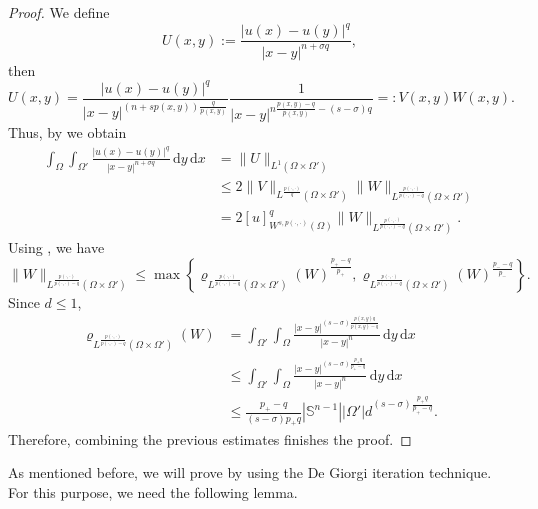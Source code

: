 \documentclass[11pt]{amsart}
\theoremstyle{plain}
\theoremstyle{definition}
\numberwithin{equation}{section}
\begin{document}
\begin{proof}
We define
\begin{equation*}
U(x,y) := \frac{|u(x)-u(y)|^q}{|x-y|^{n+\sigma q}},
\end{equation*}
then
\begin{equation*}
U(x,y) = \frac{|u(x)-u(y)|^q}{|x-y|^{(n+sp(x,y))\frac{q}{p(x,y)}}} \frac{1}{|x-y|^{n\frac{p(x,y)-q}{p(x,y)}- (s-\sigma)q}} =: V(x,y) W(x,y).
\end{equation*}
Thus, by  we obtain
\begin{equation*}
\begin{split}
\int_{\Omega} \int_{\Omega'} \frac{|u(x)-u(y)|^q}{|x-y|^{n+\sigma q}} \,\mathrm{d}y \,\mathrm{d}x 
&= \|U\|_{L^1(\Omega \times \Omega')} \\
&\leq 2\|V\|_{L^{\frac{p(\cdot,\cdot)}{q}}(\Omega \times \Omega')} \|W\|_{L^{\frac{p(\cdot,\cdot)}{p(\cdot,\cdot)-q}}(\Omega \times \Omega')} \\
&= 2[u]_{W^{s,p(\cdot,\cdot)}(\Omega)}^q \|W\|_{L^{\frac{p(\cdot,\cdot)}{p(\cdot,\cdot)-q}}(\Omega \times \Omega')}.
\end{split}
\end{equation*}
Using , we have
\begin{equation*}
\|W\|_{L^{\frac{p(\cdot,\cdot)}{p(\cdot,\cdot)-q}}(\Omega \times \Omega')} \leq \max \left\lbrace \varrho_{L^{\frac{p(\cdot,\cdot)}{p(\cdot,\cdot)-q}}(\Omega \times \Omega')}(W)^{\frac{p_+-q}{p_+}}, \varrho_{L^{\frac{p(\cdot,\cdot)}{p(\cdot,\cdot)-q}}(\Omega \times \Omega')}(W)^{\frac{p_--q}{p_-}} \right\rbrace.
\end{equation*}
Since $d \leq 1$, 
\begin{equation*}
\begin{split}
\varrho_{L^{\frac{p(\cdot,\cdot)}{p(\cdot,\cdot)-q}}(\Omega \times \Omega')}(W)
&= \int_{\Omega'} \int_{\Omega} \frac{|x-y|^{(s-\sigma)\frac{p(x,y)q}{p(x,y)-q}}}{|x-y|^n} \,\mathrm{d}y \,\mathrm{d}x \\
&\leq \int_{\Omega'} \int_{\Omega} \frac{|x-y|^{(s-\sigma)\frac{p_+q}{p_+-q}}}{|x-y|^n} \,\mathrm{d}y \,\mathrm{d}x \\
&\leq \frac{p_+-q}{(s-\sigma)p_+q} |\mathbb{S}^{n-1}| |\Omega'| d^{(s-\sigma)\frac{p_+q}{p_+-q}}.
\end{split}
\end{equation*}
Therefore, combining the previous estimates finishes the proof.
\end{proof}

As mentioned before, we will prove  by using the De Giorgi iteration technique. For this purpose, we need the following lemma.
\end{document}
